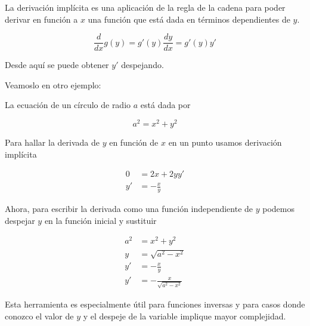 \documentclass[spanish,12pt]{article}
\begin{document}
La derivación implícita es una aplicación de la regla de la cadena para poder derivar en función a $x$ una función que está dada en términos dependientes de $y$.


$$\frac{d}{dx}g(y)=g'(y)\frac{dy}{dx}=g'(y)y'$$


Desde aquí se puede obtener $y'$ despejando.

Veamoslo en otro ejemplo:

La ecuación de un círculo de radio $a$ está dada por

$$a^2=x^2+y^2$$

Para hallar la derivada de $y$ en función de $x$ en un punto usamos derivación implícita

\begin{align*}
    0&=2x+2yy'\\
    y'&=-\frac{x}{y}
\end{align*}

Ahora, para escribir la derivada como una función independiente de $y$ podemos despejar $y$ en la función inicial y sustituir

\begin{align*}
    a^2&=x^2+y^2\\
    y&=\sqrt{a^2-x^2}\\
    y'&=-\frac{x}{y}\\
    y'&=-\frac{x}{\sqrt{a^2-x^2}}
\end{align*}

Esta herramienta es especialmente útil para funciones inversas y para casos donde conozco el valor de $y$ y el despeje de la variable implique mayor complejidad.
\end{document}
